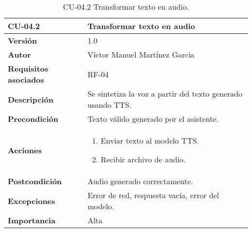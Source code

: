 \begin{table}[p]
    \centering
    \begin{tabularx}{\linewidth}{ p{} p{} }
        \toprule
        \textbf{CU-04.2}    & \textbf{Transformar texto en audio}\\
        \toprule
        \textbf{Versión}              & 1.0 \\
        \textbf{Autor}                & Víctor Manuel Martínez Garcia \\
        \textbf{Requisitos asociados} & RF-04 \\
        \textbf{Descripción}          & Se sintetiza la voz a partir del texto generado usando TTS.\\
        \textbf{Precondición}         & Texto válido generado por el asistente.\\
        \textbf{Acciones}             &
        \begin{enumerate}
          \item Enviar texto al modelo TTS.
          \item Recibir archivo de audio.
        \end{enumerate}\\
        \textbf{Postcondición}        & Audio generado correctamente.\\
        \textbf{Excepciones}          & Error de red, respuesta vacía, error del modelo.\\
        \textbf{Importancia}          & Alta \\
        \bottomrule
    \end{tabularx}
    \caption{CU-04.2 Transformar texto en audio.}
    \label{CU-04.2 Transformar texto en audio}
\end{table}


